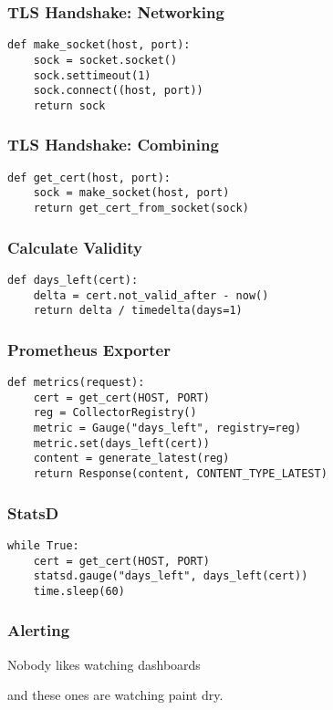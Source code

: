 \begin{frame}[fragile]
\frametitle{TLS Handshake: Networking}
\begin{lstlisting}
def make_socket(host, port):
    sock = socket.socket()
    sock.settimeout(1)
    sock.connect((host, port))
    return sock
\end{lstlisting}
\end{frame}

\begin{frame}[fragile]
\frametitle{TLS Handshake: Combining}
\begin{lstlisting}
def get_cert(host, port):
    sock = make_socket(host, port)
    return get_cert_from_socket(sock)
\end{lstlisting}
\end{frame}

\begin{frame}[fragile]
\frametitle{Calculate Validity}

\begin{lstlisting}
def days_left(cert):
    delta = cert.not_valid_after - now()
    return delta / timedelta(days=1)
\end{lstlisting}
\end{frame}


\begin{frame}[fragile]
\frametitle{Prometheus Exporter}

\begin{lstlisting}
def metrics(request):
    cert = get_cert(HOST, PORT)
    reg = CollectorRegistry()
    metric = Gauge("days_left", registry=reg)
    metric.set(days_left(cert))
    content = generate_latest(reg)
    return Response(content, CONTENT_TYPE_LATEST)
\end{lstlisting}
\end{frame}

\begin{frame}[fragile]
\frametitle{StatsD}

\begin{lstlisting}
while True:
    cert = get_cert(HOST, PORT)
    statsd.gauge("days_left", days_left(cert))
    time.sleep(60)
\end{lstlisting}
\end{frame}

\begin{frame}
\frametitle{Alerting}

Nobody likes watching dashboards \pause

and these ones are watching paint dry.
\end{frame}


